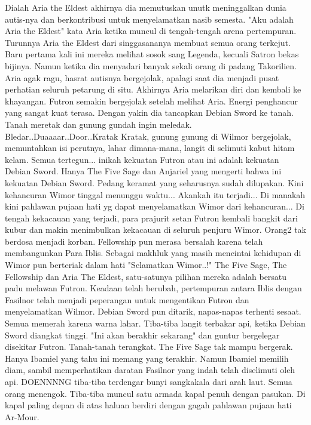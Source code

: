 \documentclass[a4paper,11pt,final]{article}
\begin{document}
Dialah Aria the Eldest akhirnya dia memutuskan unutk meninggalkan dunia autis-nya dan berkontribusi untuk menyelamatkan nasib semesta.
"Aku adalah Aria the Eldest" kata Aria ketika muncul di tengah-tengah arena pertempuran. Turunnya Aria the Eldest dari singgasananya membuat semua orang terkejut. Baru pertama kali ini mereka melihat sosok sang Legenda, kecuali Satron bekas bijinya.
Namun ketika dia menyadari banyak sekali orang di padang Takorilien. Aria agak ragu, hasrat autisnya bergejolak, apalagi saat dia menjadi pusat perhatian seluruh petarung di situ.
Akhirnya Aria melarikan diri dan kembali ke khayangan. Futron semakin bergejolak setelah melihat Aria. Energi penghancur yang sangat kuat terasa. Dengan yakin dia tancapkan Debian Sword ke tanah. Tanah meretak dan gunung gundah ingin meledak.
Bledar..Duaaaar..Door..Kratak Kratak, gunung gunung di Wilmor bergejolak, memuntahkan isi perutnya, lahar dimana-mana, langit di selimuti kabut hitam kelam.
Semua tertegun... inikah kekuatan Futron atau ini adalah kekuatan Debian Sword. Hanya The Five Sage dan Anjariel yang mengerti bahwa ini kekuatan Debian Sword. Pedang keramat yang seharusnya sudah dilupakan.
Kini kehancuran Wimor tinggal menunggu waktu... Akankah itu terjadi... Di manakah kini pahlawan pujaan hati yg dapat menyelamatkan Wimor dari kehancuran...
Di tengah kekacauan yang terjadi, para prajurit setan Futron kembali bangkit dari kubur dan makin menimbulkan kekacauan di seluruh penjuru Wimor. Orang2 tak berdosa menjadi korban. Fellowship pun merasa bersalah karena telah membangunkan Para Iblis.
Sebagai makhluk yang masih mencintai kehidupan di Wimor pun berteriak dalam hati "Selamatkan Wimor..!" The Five Sage, The Fellowship dan Aria The Eldest, satu-satunya pilihan mereka adalah bersatu padu melawan Futron.
Keadaan telah berubah, pertempuran antara Iblis dengan Fasilnor telah menjadi peperangan untuk mengentikan Futron dan menyelamatkan Wilmor. Debian Sword pun ditarik, napas-napas terhenti sesaat. Semua memerah karena warna lahar.
Tiba-tiba langit terbakar api, ketika Debian Sword diangkat tinggi.
"Ini akan berakhir sekarang" dan guntur bergelegar disekitar Futron. Tanah-tanah terangkat. The Five Sage tak mampu bergerak. Hanya Ibamiel yang tahu ini memang yang terakhir.
Namun Ibamiel memilih diam, sambil memperhatikan daratan Fasilnor yang indah telah diselimuti oleh api.
DOENNNNG tiba-tiba terdengar bunyi sangkakala dari arah laut. Semua orang menengok. Tiba-tiba muncul satu armada kapal penuh dengan pasukan. Di kapal paling depan di atas haluan berdiri dengan gagah pahlawan pujaan hati Ar-Mour.
\end{document}
